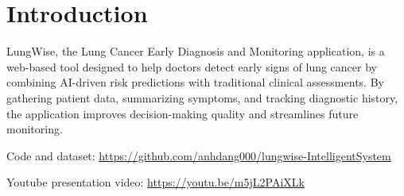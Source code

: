 \section{Introduction}
LungWise, the Lung Cancer Early Diagnosis and Monitoring application, is a web-based tool designed to help doctors detect early signs of lung cancer by combining AI-driven risk predictions with traditional clinical assessments. By gathering patient data, summarizing symptoms, and tracking diagnostic history, the application improves decision-making quality and streamlines future monitoring.

Code and dataset: \url{https://github.com/anhdang000/lungwise-IntelligentSystem}

Youtube presentation video: \url{https://youtu.be/m5jL2PAiXLk}
